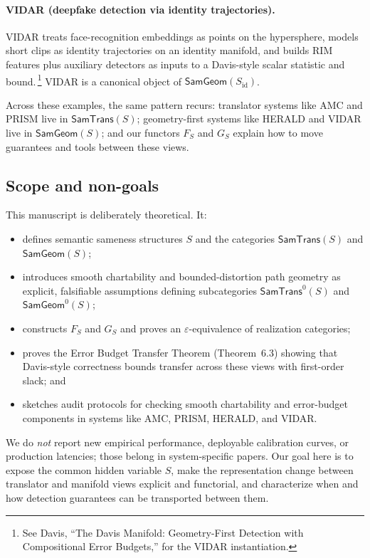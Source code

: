 \documentclass[11pt]{article}
\newcommand{\SamTrans}{\mathsf{SamTrans}}
\newcommand{\SamGeom}{\mathsf{SamGeom}}
\begin{document}
\paragraph{VIDAR (deepfake detection via identity trajectories).}
VIDAR treats face-recognition embeddings as points on the hypersphere, models short clips as
identity trajectories on an identity manifold, and builds RIM features plus auxiliary detectors as
inputs to a Davis-style scalar statistic and bound.\,\footnote{See Davis,
``The Davis Manifold: Geometry-First Detection with Compositional Error Budgets,'' for the VIDAR
instantiation.}  VIDAR is a canonical object of $\SamGeom(S_{\mathrm{id}})$.

Across these examples, the same pattern recurs: translator systems like AMC and PRISM live in
$\SamTrans(S)$; geometry-first systems like HERALD and VIDAR live in $\SamGeom(S)$; and our
functors $F_S$ and $G_S$ explain how to move guarantees and tools between these views.

\subsection{Scope and non-goals}

This manuscript is deliberately theoretical.  It:

\begin{itemize}
  \item defines semantic sameness structures $S$ and the categories $\SamTrans(S)$ and
  $\SamGeom(S)$;
  \item introduces smooth chartability and bounded-distortion path geometry as explicit, falsifiable
  assumptions defining subcategories $\SamTrans^0(S)$ and $\SamGeom^0(S)$;
  \item constructs $F_S$ and $G_S$ and proves an $\varepsilon$-equivalence of realization categories;
  \item proves the Error Budget Transfer Theorem (Theorem~6.3) showing that Davis-style correctness
  bounds transfer across these views with first-order slack; and
  \item sketches audit protocols for checking smooth chartability and error-budget components in
  systems like AMC, PRISM, HERALD, and VIDAR.
\end{itemize}

We do \emph{not} report new empirical performance, deployable calibration curves, or production
latencies; those belong in system-specific papers.  Our goal here is to expose the common hidden
variable $S$, make the representation change between translator and manifold views explicit and
functorial, and characterize when and how detection guarantees can be transported between them.
\end{document}
